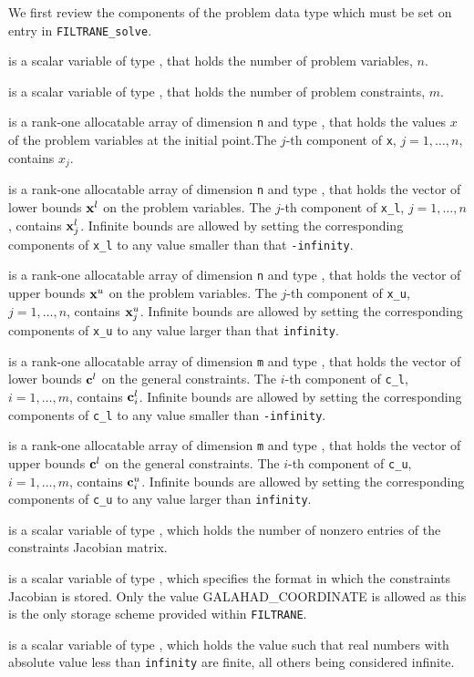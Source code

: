 \documentclass{galahad}
\newcommand{\packagename}{FILTRANE}
\newcommand{\sym}{\sf\small}
\newcommand{\filtrane}{{\tt \packagename}}
\begin{document}
\noindent
We first review the components of the problem data type which must be set on
entry in {\tt \packagename\_solve}.
\begin{description}
 is a scalar variable of type \integer, 
 that holds the number of problem variables, $n$.  

 is a scalar variable of type \integer, 
 that holds the number of problem constraints, $m$.

 is a rank-one allocatable array of dimension {\tt n} and type 
\realdp, that holds the values $x$ of the problem variables at the
initial point.The $j$-th component of {\tt x}, $j = 1,  \ldots , n$, contains
$x_{j}$.

 is a rank-one allocatable array of dimension {\tt n} and type 
\realdp, that holds
the vector of lower bounds ${\mathbf{x}}^l$ on the problem variables.
The $j$-th component of {\tt x\_l}, $j = 1, \ldots , n$, 
contains ${\mathbf{x}}^l_{j}$.
Infinite bounds are allowed by setting the corresponding 
components of {\tt x\_l} to any value smaller than that {\tt -infinity}.

 is a rank-one allocatable array of dimension {\tt n} and type 
\realdp, that holds
the vector of upper bounds ${\mathbf{x}}^u$ on the problem variables.
The $j$-th component of {\tt x\_u}, $j = 1, \ldots , n$, 
contains ${\mathbf{x}}^u_{j}$.
Infinite bounds are allowed by setting the corresponding 
components of {\tt x\_u} to any value larger than that {\tt infinity}.

 is a rank-one allocatable array of dimension {\tt m} and type 
\realdp, that holds the vector of lower bounds ${\mathbf{c}}^{l}$ 
on the general constraints. The $i$-th component of 
{\tt c\_l}, $i = 1, \ldots , m$, contains ${\mathbf{c}}_{i}^{l}$.
Infinite bounds are allowed by setting the corresponding 
components of {\tt c\_l} to any value smaller than {\tt -infinity}. 

 is a rank-one allocatable array of dimension {\tt m} and type 
\realdp, that holds the vector of upper bounds ${\mathbf{c}}^{l}$ 
on the general constraints. The $i$-th component of 
{\tt c\_u}, $i = 1, \ldots , m$, contains ${\mathbf{c}}_{i}^{u}$.
Infinite bounds are allowed by setting the corresponding 
components of {\tt c\_u} to any value larger than {\tt infinity}. 

 is a scalar variable of type \integer, 
which holds the number of nonzero entries of the constraints Jacobian matrix.

 is a scalar variable of type \integer, 
which specifies the format in which the constraints Jacobian is stored.
Only the value {\sym GALAHAD\_COORDINATE} is allowed as this is the only
storage scheme provided within \filtrane.

 is a scalar variable of type \realdp, which
holds the value such that real numbers with absolute value less than
{\tt infinity} are finite, all others being considered infinite.
\end{description}
\end{document}
